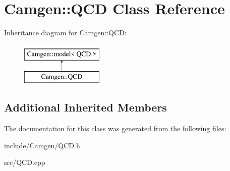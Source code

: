 \hypertarget{a00449}{\section{Camgen\-:\-:Q\-C\-D Class Reference}
\label{a00449}
}
Inheritance diagram for Camgen\-:\-:Q\-C\-D\-:\begin{figure}[H]
\begin{center}
\leavevmode
\includegraphics[height=2.000000cm]{a00449}
\end{center}
\end{figure}
\subsection*{Additional Inherited Members}


The documentation for this class was generated from the following files\-:\begin{DoxyCompactItemize}
\item 
include/\-Camgen/Q\-C\-D.\-h\item 
src/Q\-C\-D.\-cpp\end{DoxyCompactItemize}
